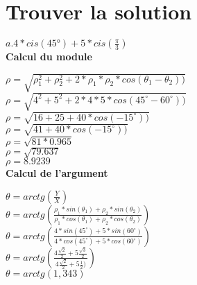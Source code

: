 \newpage

\vspace{3mm} %
\section{Trouver la solution}
\vspace{3mm} %

$a. 4*cis(45°) + 5*cis(\frac{\pi}{3})$\\

\textbf{Calcul du module} \\
\vspace{3mm} %

$\rho = \sqrt{\rho_1^{2}+\rho_2^{2} + 2 * \rho_1 * \rho_2 * cos(\theta_1-\theta_2))}$ \\

$\rho = \sqrt{4^{2}+5^{2} + 2*4*5 * cos(45^{\circ}-60^{\circ}))}$ \\

$\rho = \sqrt{16+25 + 40 * cos(-15^{\circ}))}$ \\

$\rho = \sqrt{41 + 40 * cos(-15^{\circ}))}$ \\

$\rho = \sqrt{81 * 0.965}$ \\

$\rho = \sqrt{79.637}$ \\

$\rho = 8.9239 $ \\

\textbf{Calcul de l'argument} \\
\vspace{3mm} %

$\theta = arctg(\frac{Y}{X})$ \\

$\theta = arctg(\frac{\rho_1 * sin(\theta_1) + \rho_2 * sin(\theta_2)} {\rho_1 * cos(\theta_1) + \rho_2 * cos(\theta_2)})$ \\

$\theta = arctg(\frac{4 * sin(45^{\circ}) + 5 * sin(60^{\circ})} {4 * cos(45^{\circ}) + 5 * cos(60^{\circ})})$ \\

$\theta = arctg(\frac{4\frac{\sqrt{2}} {2} + 5\frac{\sqrt{3}} {2}} {4\frac{\sqrt{2}} {2} + 5\frac{1} {2})})$ \\

$\theta = arctg(1,343)$ \\

